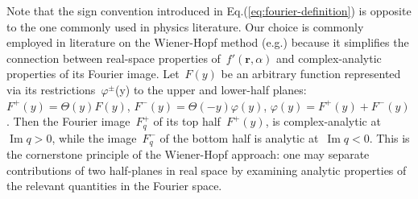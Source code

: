 \documentclass[preprint,aps,eqsecnum]{revtex4-1}
\newcommand{\fplus}[1]{{#1}^{+}}
\newcommand{\fminus}[1]{{#1}^{-}}
\newcommand{\fplusminus}[1]{{#1}^{\pm}}
\renewcommand{\Im}{\mathop{\mathrm{Im}}\nolimits}
\begin{document}
Note that the sign convention introduced in Eq.(\ref{eq:fourier-definition})
is opposite to the one commonly used in physics literature. Our choice is
commonly employed in literature on the Wiener-Hopf
method (e.g.\cite{bib:wiener-hopf})
because it simplifies the connection between real-space
properties of~$f'({\bm r}, \alpha)$
and complex-analytic properties of its Fourier image.
Let~$F(y)$ be an arbitrary function represented
via its restrictions~$\fplusminus{\varphi}$(y)
to the upper and lower-half planes: $\fplus{F}(y) = \Theta(y)F(y)$,
$\fminus{F}(y) = \Theta(-y) \varphi(y)$,
$\varphi(y) = \fplus{F}(y) + \fminus{F}(y)$.
Then the Fourier image~$\fplus{F}_q$ of its top half~$\fplus{F}(y)$,
is complex-analytic at~$\Im q > 0$, while the image~$\fminus{F}_{q}$
of the bottom half is analytic at~$\Im q < 0$.
This is the cornerstone principle of
the Wiener-Hopf approach: one may separate contributions
of two half-planes in real space by examining analytic properties
of the relevant quantities in the Fourier space.
\end{document}
